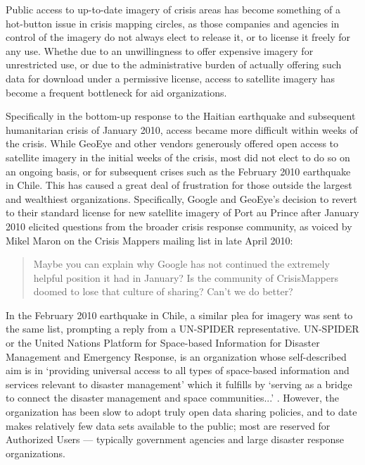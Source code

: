 \documentclass[11pt,oneside,notitlepage]{report}
\begin{document}
Public access to up-to-date imagery of crisis areas has become something of a hot-button issue in crisis mapping circles, as those companies and agencies in control of the imagery do not always elect to release it, or to license it freely for any use. Whethe due to an unwillingness to offer expensive imagery for unrestricted use, or due to the administrative burden of actually offering such data for download under a permissive license, access to satellite imagery has become a frequent bottleneck for aid organizations. 

Specifically in the bottom-up response to the Haitian earthquake and subsequent humanitarian crisis of January 2010, access became more difficult within weeks of the crisis. While GeoEye and other vendors generously offered open access to satellite imagery in the initial weeks of the crisis, most did not elect to do so on an ongoing basis, or for subsequent crises such as the February 2010 earthquake in Chile. This has caused a great deal of frustration for those outside the largest and wealthiest organizations. Specifically, Google and GeoEye's decision to revert to their standard license for new satellite imagery of Port au Prince after January 2010 elicited questions from the broader crisis response community, as voiced by Mikel Maron on the Crisis Mappers mailing list in late April 2010:

\begin{quote}
Maybe you can explain why Google has not continued the extremely helpful position it had in January?
Is the community of CrisisMappers doomed to lose that culture of sharing? Can't we do better?
\end{quote}

In the February 2010 earthquake in Chile, a similar plea for imagery was sent to the same list, prompting a reply from a UN-SPIDER representative. UN-SPIDER or the United Nations Platform for Space-based Information for Disaster Management and Emergency Response, is an organization whose self-described aim is in `providing universal access to all types of space-based information and services relevant to disaster management' which it fulfills by `serving as a bridge to connect the disaster management and space communities...' \cite{unspider2010aims}. However, the organization has been slow to adopt truly open data sharing policies, and to date makes relatively few data sets available to the public; most are reserved for Authorized Users --- typically government agencies and large disaster response organizations. \cite{charter2010brochure}  
\end{document}
